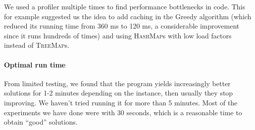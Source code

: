 \documentclass[11pt, a4paper, leqno]{article}
\begin{document}
	We used a profiler multiple times to find performance bottlenecks in code. This for example suggested us the idea to add caching in the Greedy algorithm (which reduced its running time from 360 ms to 120 ms, a considerable improvement since it runs hundreds of times) and using \textsc{HashMap}s with low load factors instead of \textsc{TreeMap}s.
	
	\paragraph{Optimal run time}
	
	From limited testing, we found that the program yields increasingly better solutions for 1-2 minutes depending on the instance, then usually they stop improving. We haven't tried running  it for more than 5 minutes. Most of the experiments we have done were with 30 seconds, which is a reasonable time to obtain ``good'' solutions.
	
\end{document}

